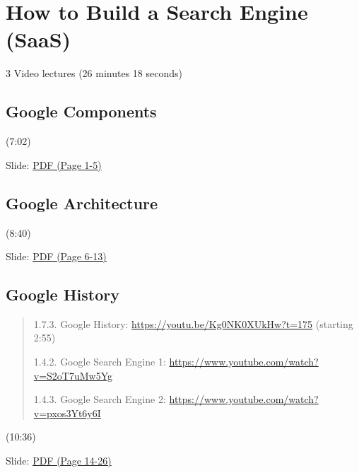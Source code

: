 \section{How to Build a Search Engine
(SaaS)}




  3 Video lectures (26 minutes 18 seconds)


\subsection{Google Components}




  (7:02)

  Slide:
  \href{https://drive.google.com/open?id=0B88HKpainTSfYWZ0dDlrNThkVms}{PDF
  (Page 1-5)}


\subsection{Google Architecture}




  (8:40)

  Slide:
  \href{https://drive.google.com/open?id=0B88HKpainTSfYWZ0dDlrNThkVms}{PDF
  (Page 6-13)}


\subsection{Google History}

\begin{quote}



  1.7.3. Google History: \url{https://youtu.be/Kg0NK0XUkHw?t=175}
  (starting 2:55)

  1.4.2. Google Search Engine 1:
  \url{https://www.youtube.com/watch?v=S2oT7uMw5Yg}

  1.4.3. Google Search Engine 2:
  \url{https://www.youtube.com/watch?v=pxos3Yt6y6I}

\end{quote}




  (10:36)

  Slide:
  \href{https://drive.google.com/open?id=0B88HKpainTSfYWZ0dDlrNThkVms}{PDF
  (Page 14-26)}

